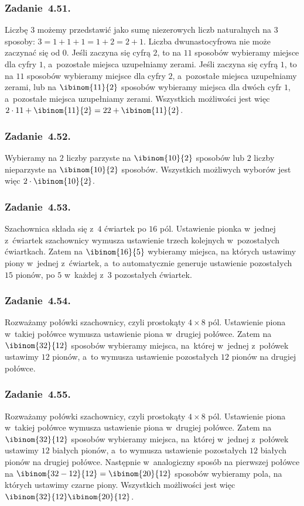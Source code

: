 \subsubsection*{Zadanie~4.51.}
Liczbę \(3\) możemy przedstawić jako sumę niezerowych liczb naturalnych na \(3\) sposoby: \(3 = 1 + 1 + 1 = 1 + 2 = 2 + 1\). Liczba dwunastocyfrowa nie może zaczynać się od \(0\). Jeśli zaczyna się cyfrą \(2\), to na \(11\) sposobów wybieramy miejsce dla cyfry \(1\), a~pozostałe miejsca uzupełniamy zerami. Jeśli zaczyna się cyfrą \(1\), to na \(11\) sposobów wybieramy miejsce dla cyfry \(2\), a~pozostałe miejsca uzupełniamy zerami, lub na \(\ibinom{11}{2}\) sposobów wybieramy miejsca dla dwóch cyfr \(1\), a~pozostałe miejsca uzupełniamy zerami. Wszystkich możliwości jest więc \(2 \cdot 11 + \ibinom{11}{2} = 22 + \ibinom{11}{2}\).
\subsubsection*{Zadanie~4.52.}
Wybieramy na \(2\) liczby parzyste na \(\ibinom{10}{2}\) sposobów lub \(2\) liczby nieparzyste na \(\ibinom{10}{2}\) sposobów. Wszystkich możliwych wyborów jest więc \(2 \cdot \ibinom{10}{2}\).
\subsubsection*{Zadanie~4.53.}
Szachownica składa się z~\(4\) ćwiartek po \(16\) pól. Ustawienie pionka w~jednej z~ćwiartek szachownicy wymusza ustawienie trzech kolejnych w~pozostałych ćwiartkach. Zatem na \(\ibinom{16}{5}\) wybieramy miejsca, na których ustawimy piony w~jednej z~ćwiartek, a~to automatycznie generuje ustawienie pozostałych \(15\) pionów, po \(5\) w~każdej z~\(3\) pozostałych ćwiartek.
\subsubsection*{Zadanie~4.54.}
Rozważamy połówki szachownicy, czyli prostokąty \(4 \times 8\) pól. Ustawienie piona w~takiej połówce wymusza ustawienie piona w~drugiej połówce. Zatem na \(\ibinom{32}{12}\) sposobów wybieramy miejsca, na~której w~jednej z~połówek ustawimy \(12\) pionów, a~to wymusza ustawienie pozostałych \(12\) pionów na drugiej połówce.
\subsubsection*{Zadanie~4.55.}
Rozważamy połówki szachownicy, czyli prostokąty \(4 \times 8\) pól. Ustawienie piona w~takiej połówce wymusza ustawienie piona w~drugiej połówce. Zatem na \(\ibinom{32}{12}\) sposobów wybieramy miejsca, na~której w~jednej z~połówek ustawimy \(12\) białych pionów, a~to wymusza ustawienie pozostałych \(12\) białych pionów na drugiej połówce. Następnie w~analogiczny sposób na pierwszej połówce na \(\ibinom{32 - 12}{12} = \ibinom{20}{12}\) sposobów wybieramy pola, na których ustawimy czarne piony. Wszystkich możliwości jest więc \(\ibinom{32}{12}\ibinom{20}{12}\).
